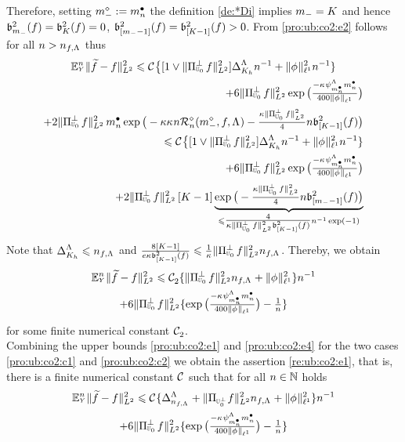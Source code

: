 \begin{pro}
Therefore,
  setting $\mdDi:=\sDi{\ssY}$ the definition  \eqref{de:*Di} implies  $\mDi=K$ and hence
  $\bias[\mDi]^2(\xdf)=\bias[K]^2(\xdf)=0$,
  $\bias[{[\mDi-1]}]^2(\xdf)=\bias[{[K-1]}]^2(\xdf)>0$. From
  \eqref{pro:ub:co2:e2} follows for all $\ssY>\ssY_{\xdf,\iSv}$  thus
\begin{multline}\label{pro:ub:co2:e3}
\FuEx[\ssY]{\rY}\VnormLp{\txdf-\xdf}^2\leq\cst{}\big\{
[1\vee\VnormLp{\Proj[{\mHiH[0]}]^\perp\xdf}^2]\DipenSv[K_{\ydf}]\ssY^{-1}+\Vnormlp[1]{\fydf}^2
\ssY^{-1}\}\\\hfill
+6\VnormLp{\Proj[{\mHiH[0]}]^\perp\xdf}^2 \exp\big(\tfrac{-\cpen\cmSv[\sDi{\ssY}]\sDi{\ssY}}{400\Vnormlp[1]{\fydf}}\big)
\\\hfill
\hfill+2\VnormLp{\Proj[{\mHiH[0]}]^\perp\xdf}^2\,\sDi{\ssY}\exp\big(-\rWc\cpen\ssY\hRa{\mdDi,\xdf,\iSv}-
    \tfrac{\rWc\VnormLp{\Proj[{\mHiH[0]}]^\perp\xdf}^2}{4}\ssY\bias[{[K-1]}]^2(\xdf)\big)\\\hfill
\leq\cst{}\big\{
[1\vee\VnormLp{\Proj[{\mHiH[0]}]^\perp\xdf}^2]\DipenSv[K_{\ydf}]\ssY^{-1}+\Vnormlp[1]{\fydf}^2
\ssY^{-1}\}\\\hfill
+6\VnormLp{\Proj[{\mHiH[0]}]^\perp\xdf}^2 \exp\big(\tfrac{-\cpen\cmSv[\sDi{\ssY}]\sDi{\ssY}}{400\Vnormlp[1]{\fydf}}\big)
\\\hfill
+2\VnormLp{\Proj[{\mHiH[0]}]^\perp\xdf}^2\,[K-1]\underbrace{\exp\big(-\tfrac{\rWc\VnormLp{\Proj[{\mHiH[0]}]^\perp\xdf}^2}{4}\ssY\bias[{[\mDi-1]}]^2(\xdf)\big)}_{\leq
  \tfrac{4}{\rWc\VnormLp{\Proj[{\mHiH[0]}]^\perp\xdf}^2\bias[{[K-1]}]^2(\xdf)}\ssY^{-1}\exp(-1)}
\end{multline}
Note that $\DipenSv[K_{\ydf}]\leq\ssY_{\xdf,\iSv}$ and
$\tfrac{8[K-1]}{e\rWc\bias[{[K-1]}]^2(\xdf)}\leq\tfrac{1}{\rWc}\VnormLp{\Proj[{\mHiH[0]}]^\perp\xdf}^2\ssY_{\xdf,\iSv}$. Thereby,
we obtain 
\begin{multline}\label{pro:ub:co2:e4}
\FuEx[\ssY]{\rY}\VnormLp{\txdf-\xdf}^2
\leq\cst{2}\{\VnormLp{\Proj[{\mHiH[0]}]^\perp\xdf}^2\ssY_{\xdf,\iSv}+ \Vnormlp[1]{\fydf}^2\}\ssY^{-1}\\
+ 6\VnormLp{\Proj[{\mHiH[0]}]^\perp\xdf}^2\{ \exp\big(\tfrac{-\cpen\cmSv[\sDi{\ssY}]\sDi{\ssY}}{400\Vnormlp[1]{\fydf}}\big)-\tfrac{1}{\ssY}\}
 \end{multline}
for some finite numerical constant $\cst{2}$.\\
Combining
the upper bounds 
\eqref{pro:ub:co2:e1} and
\eqref{pro:ub:co2:e4} for the two
cases \ref{pro:ub:co2:c1} and \ref{pro:ub:co2:c2}  we obtain the
assertion \eqref{re:ub:co2:e1}, that is, there is a finite numerical
constant $\cst{}$ such that  for all
$\ssY\in\Nz$ holds
\begin{multline}\label{pro:ub:co2:e5}
\FuEx[\ssY]{\rY}\VnormLp{\txdf-\xdf}^2
\leq\cst{}\{\DipenSv[\ssY_{\xdf,\iSv}]+\VnormLp{\Proj[{\mHiH[0]^\perp}]\xdf}^2\ssY_{\xdf,\iSv}+ \Vnormlp[1]{\fydf}^2\}\ssY^{-1}\\
+ 6\VnormLp{\Proj[{\mHiH[0]}]^\perp\xdf}^2\{ \exp\big(\tfrac{-\cpen\cmSv[\sDi{\ssY}]\sDi{\ssY}}{400\Vnormlp[1]{\fydf}}\big)-\tfrac{1}{\ssY}\}
\end{multline}


\end{pro}

